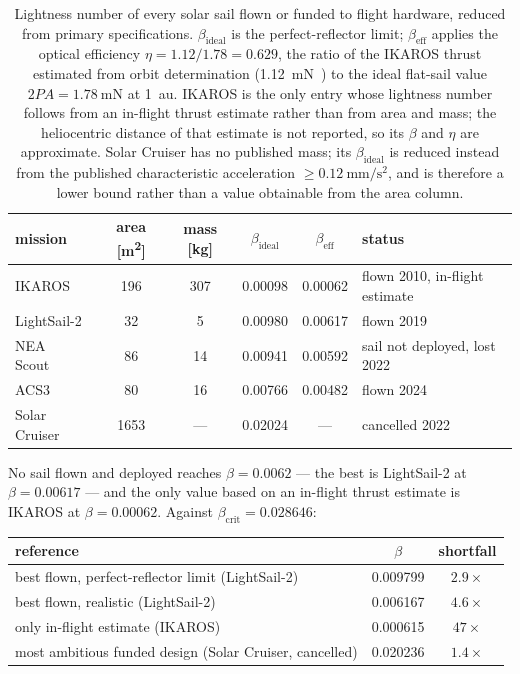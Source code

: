 \documentclass[pdflatex,sn-mathphys-num]{sn-jnl}
\begin{document}
\begin{table}[t]
  \centering
  \caption{Lightness number of every solar sail flown or funded to flight
  hardware, reduced from primary specifications. $\beta_{\mathrm{ideal}}$ is the
  perfect-reflector limit; $\beta_{\mathrm{eff}}$ applies the optical efficiency
  $\eta=1.12/1.78=0.629$, the ratio of the IKAROS thrust estimated from orbit
  determination (\SI{1.12}{\milli\newton}~\cite{jaxa2010ikaros}) to the ideal
  flat-sail value $2PA=\SI{1.78}{\milli\newton}$ at 1~au. IKAROS is the only entry whose lightness number follows from
  an in-flight thrust estimate rather than from area and mass; the heliocentric
  distance of that estimate is not reported, so its $\beta$ and $\eta$ are
  approximate. Solar Cruiser has no published mass; its $\beta_{\mathrm{ideal}}$
  is reduced instead from the published characteristic acceleration
  $\geq\SI{0.12}{\milli\metre\per\second\squared}$, and is therefore a lower
  bound rather than a value obtainable from the area column.}
  \label{tab:tech}
  \begin{tabular}{lccccl}
    \toprule
    mission & area [\si{\metre\squared}] & mass [\si{\kilogram}] &
    $\beta_{\mathrm{ideal}}$ & $\beta_{\mathrm{eff}}$ & status \\
    \midrule
    IKAROS~\cite{mori2010,tsuda2011}   & 196  & 307 & \num{0.00098} & \num{0.00062} & flown 2010, in-flight estimate \\
    LightSail-2~\cite{spencer2021}     & 32   & 5   & \num{0.00980} & \num{0.00617} & flown 2019 \\
    NEA Scout~\cite{mcnutt2014}        & 86   & 14  & \num{0.00941} & \num{0.00592} & sail not deployed, lost 2022 \\
    ACS3~\cite{acs3}                   & 80   & 16  & \num{0.00766} & \num{0.00482} & flown 2024 \\
    Solar Cruiser                      & 1653 & --- & \num{0.02024} & ---           & cancelled 2022 \\
    \bottomrule
  \end{tabular}
\end{table}

No sail flown and deployed reaches $\beta=\num{0.0062}$ --- the best is
LightSail-2 at $\beta=\num{0.00617}$ --- and the only value based on an in-flight
thrust estimate is IKAROS at $\beta=\num{0.00062}$. Against
$\beta_{\mathrm{crit}}=\num{0.028646}$:

\begin{center}
\begin{tabular}{lcc}
  \toprule
  reference & $\beta$ & shortfall \\
  \midrule
  best flown, perfect-reflector limit (LightSail-2) & \num{0.009799} & $2.9\times$ \\
  best flown, realistic (LightSail-2)               & \num{0.006167} & $4.6\times$ \\
  only in-flight estimate (IKAROS)                  & \num{0.000615} & $47\times$ \\
  most ambitious funded design (Solar Cruiser, cancelled) & \num{0.020236} & $1.4\times$ \\
  \bottomrule
\end{tabular}
\end{center}
\end{document}
